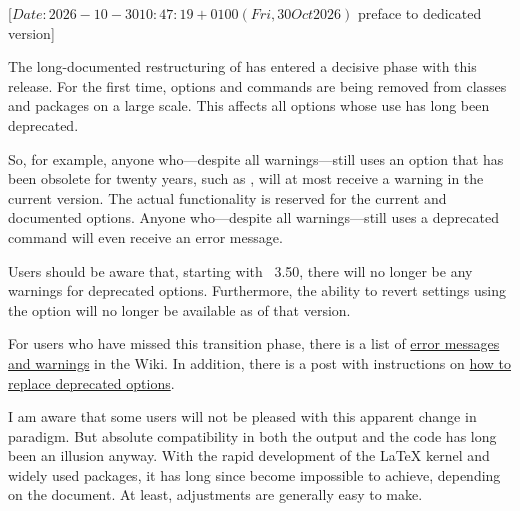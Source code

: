 %
%
%
%
%

                 [$Date: 2026-10-30 10:47:19 +0100 (Fri, 30 Oct 2026) $
                  preface to dedicated version]


The long-documented restructuring of \KOMAScript{} has entered a decisive
phase with this release. For the first time, options and commands are being
removed from classes and packages on a large scale. This affects all options
whose use has long been deprecated.

So, for example, anyone who—despite all warnings—still uses an option that has
been obsolete for twenty years, such as , will at most
receive a warning in the current version. The actual functionality is reserved
for the current and documented options.  Anyone who—despite all warnings—still
uses a deprecated command will even receive an error message.

Users should be aware that, starting with \KOMAScript~3.50, there will no
longer be any warnings for deprecated options. Furthermore, the ability to
revert settings using the  option will no longer be available
as of that version.

For users who have missed this transition phase, there is a list of
\href{https://sourceforge.net/p/koma-script/wiki-en/Messages/}{error messages
  and warnings} in the Wiki. In addition, there is a post with instructions on
\href{https://sourceforge.net/p/koma-script/wiki-en/HowTo_DeprecatedOptions/}{how
  to replace deprecated options}.

I am aware that some users will not be pleased with this apparent change in
paradigm. But absolute compatibility in both the output and the code has long
been an illusion anyway. With the rapid development of the \LaTeX{} kernel and
widely used packages, it has long since become impossible to achieve,
depending on the document. At least, adjustments are generally easy to make.

